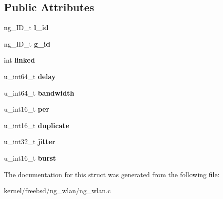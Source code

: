 \subsection*{Public Attributes}
\begin{DoxyCompactItemize}
\item 
\hypertarget{structng__wlan__hent_a2e493ddbd3a6a4c73c78d0124c62260e}{ng\+\_\+\+I\+D\+\_\+t {\bfseries l\+\_\+id}}\label{structng__wlan__hent_a2e493ddbd3a6a4c73c78d0124c62260e}

\item 
\hypertarget{structng__wlan__hent_a5446ba52929dc496c643311a1ecc29e0}{ng\+\_\+\+I\+D\+\_\+t {\bfseries g\+\_\+id}}\label{structng__wlan__hent_a5446ba52929dc496c643311a1ecc29e0}

\item 
\hypertarget{structng__wlan__hent_acb30ee9196646be1170cbeb435f13872}{int {\bfseries linked}}\label{structng__wlan__hent_acb30ee9196646be1170cbeb435f13872}

\item 
\hypertarget{structng__wlan__hent_aaf6faf4e6c64a6457199e9bae7098988}{u\+\_\+int64\+\_\+t {\bfseries delay}}\label{structng__wlan__hent_aaf6faf4e6c64a6457199e9bae7098988}

\item 
\hypertarget{structng__wlan__hent_a5b9b1bb461470052b43c774928e1a3c9}{u\+\_\+int64\+\_\+t {\bfseries bandwidth}}\label{structng__wlan__hent_a5b9b1bb461470052b43c774928e1a3c9}

\item 
\hypertarget{structng__wlan__hent_a8992189f363e8df1283c0c3d819be593}{u\+\_\+int16\+\_\+t {\bfseries per}}\label{structng__wlan__hent_a8992189f363e8df1283c0c3d819be593}

\item 
\hypertarget{structng__wlan__hent_ae9dfa5121089d9fa3c8006f0c1073afb}{u\+\_\+int16\+\_\+t {\bfseries duplicate}}\label{structng__wlan__hent_ae9dfa5121089d9fa3c8006f0c1073afb}

\item 
\hypertarget{structng__wlan__hent_a36ebf3cb2e00ff052dcb6e3bc7e4cdfb}{u\+\_\+int32\+\_\+t {\bfseries jitter}}\label{structng__wlan__hent_a36ebf3cb2e00ff052dcb6e3bc7e4cdfb}

\item 
\hypertarget{structng__wlan__hent_a6427c1479b3a541b830e5a57fe4159a6}{u\+\_\+int16\+\_\+t {\bfseries burst}}\label{structng__wlan__hent_a6427c1479b3a541b830e5a57fe4159a6}

\end{DoxyCompactItemize}


The documentation for this struct was generated from the following file\+:\begin{DoxyCompactItemize}
\item 
kernel/freebsd/ng\+\_\+wlan/ng\+\_\+wlan.\+c\end{DoxyCompactItemize}
